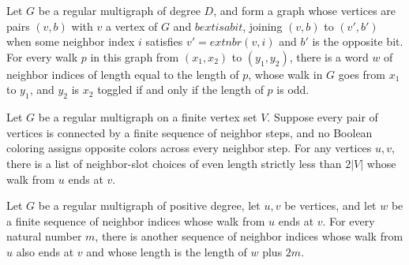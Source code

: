 \begin{theorem}
\label{Randomized.RegularMultigraph.word_of_walk}
\leanok
{}
Let $G$ be a regular multigraph of degree $D$, and form a graph whose vertices are pairs
$(v,b)$ with $v$ a vertex of $G$ and $b	ext{ is a bit}$, joining $(v,b)$ to $(v',b')$
when some neighbor index $i$ satisfies $v'=	ext{nbr}(v,i)$ and $b'$ is the opposite bit.
For every walk $p$ in this graph from $(x_1,x_2)$ to $(y_1,y_2)$, there is a word $w$ of
neighbor indices of length equal to the length of $p$, whose walk in $G$ goes from $x_1$
to $y_1$, and $y_2$ is $x_2$ toggled if and only if the length of $p$ is odd.
\end{theorem}

\begin{theorem}
\label{Randomized.RegularMultigraph.exists_even_word}
\leanok
{}
Let $G$ be a regular multigraph on a finite vertex set $V$. Suppose every pair of
vertices is connected by a finite sequence of neighbor steps, and no Boolean coloring
assigns opposite colors across every neighbor step. For any vertices $u,v$, there is a
list of neighbor-slot choices of even length strictly less than $2|V|$ whose walk from
$u$ ends at $v$.
\end{theorem}

\begin{theorem}
\label{Randomized.RegularMultigraph.exists_word_add}
\leanok
{}
Let $G$ be a regular multigraph of positive degree, let $u,v$ be vertices, and let $w$
be a finite sequence of neighbor indices whose walk from $u$ ends at $v$. For every
natural number $m$, there is another sequence of neighbor indices whose walk from $u$
also ends at $v$ and whose length is the length of $w$ plus $2m$.
\end{theorem}

